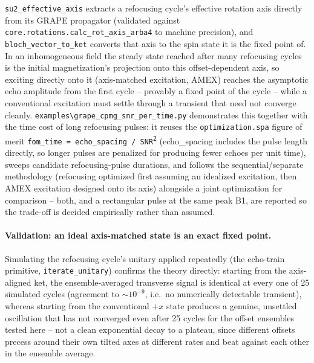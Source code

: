 \documentclass[11pt,oneside]{report}
\newcommand{\code}[1]{\texttt{#1}}
\begin{document}
\code{su2\_effective\_axis} extracts a refocusing cycle's effective rotation
axis directly from its GRAPE propagator (validated against
\code{core.rotations.calc\_rot\_axis\_arba4} to machine precision), and
\code{bloch\_vector\_to\_ket} converts that axis to the spin state it is the
fixed point of. In an inhomogeneous field the steady state reached after many
refocusing cycles is the initial magnetization's projection onto this
offset-dependent axis, so exciting directly onto it (axis-matched excitation,
AMEX) reaches the asymptotic echo amplitude from the first cycle -- provably a
fixed point of the cycle -- while a conventional excitation must settle
through a transient that need not converge cleanly.
\code{examples\textbackslash grape\_cpmg\_snr\_per\_time.py} demonstrates
this together with the time cost of long refocusing pulses: it reuses the
\code{optimization.spa} figure of merit \code{fom\_time = echo\_spacing /
SNR\textsuperscript{2}} (echo\_spacing includes the pulse length directly, so
longer pulses are penalized for producing fewer echoes per unit time), sweeps
candidate refocusing-pulse durations, and follows the sequential/separate
methodology (refocusing optimized first assuming an idealized excitation,
then AMEX excitation designed onto its axis) alongside a joint
optimization for comparison -- both, and a rectangular pulse at the same peak
B1, are reported so the trade-off is decided empirically rather than assumed.

\paragraph{Validation: an ideal axis-matched state is an exact fixed point.}
Simulating the refocusing cycle's unitary applied repeatedly (the echo-train
primitive, \code{iterate\_unitary}) confirms the theory directly: starting
from the axis-aligned ket, the ensemble-averaged transverse signal is
identical at every one of 25 simulated cycles (agreement to \(\sim 10^{-9}\),
i.e.\ no numerically detectable transient), whereas starting from the
conventional \(+x\) state produces a genuine, unsettled oscillation that has
not converged even after 25 cycles for the offset ensembles tested here --
not a clean exponential decay to a plateau, since different offsets precess
around their own tilted axes at different rates and beat against each other
in the ensemble average.
\end{document}
